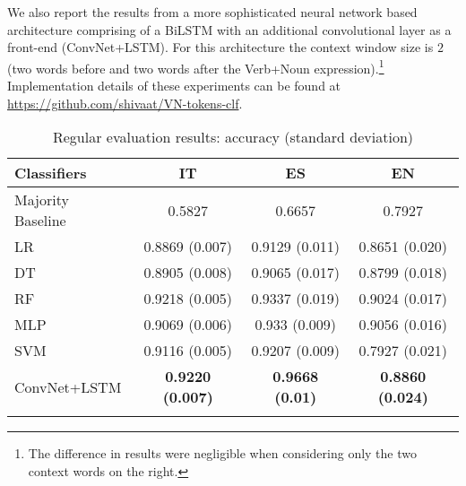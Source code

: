 \documentclass[output=paper
,modfonts
,nonflat]{langsci/langscibook}
\begin{document}
We also report the results from a more sophisticated neural network based architecture comprising of a BiLSTM with an additional convolutional layer as a front-end (ConvNet+LSTM). For this architecture the context window size is $2$ (two words before and two words after the Verb+Noun expression).\footnote{The difference in results were negligible when considering only the two context words on the right.} Implementation details of these experiments can be found at \url{https://github.com/shivaat/VN-tokens-clf}. 

\begin{table}[!ht]
\caption{Regular evaluation results: accuracy (standard deviation)}
\label{tab:regular}
 \begin{tabular}{l|ccc} 
  \lsptoprule
   Classifiers & IT & ES & EN  \\
  \midrule
   Majority Baseline & 0.5827 & 0.6657 & 0.7927\\
   LR & 0.8869 (0.007)  & 0.9129 (0.011) & 0.8651 (0.020)  \\
   DT  & 0.8905 (0.008) & 0.9065 (0.017) &  0.8799 (0.018) \\
   RF & 0.9218 (0.005) & 0.9337 (0.019)  &  0.9024 (0.017)\\
   MLP & 0.9069 (0.006) & 0.933 (0.009) &  0.9056 (0.016) \\
   SVM  & 0.9116 (0.005) & 0.9207 (0.009) & 0.7927 (0.021) \\
   ConvNet+LSTM  & \textbf{0.9220 (0.007)} & \textbf{0.9668 (0.01)} & \textbf{0.8860 (0.024)} \\
  \lspbottomrule
 \end{tabular}
\end{table}
\end{document}
